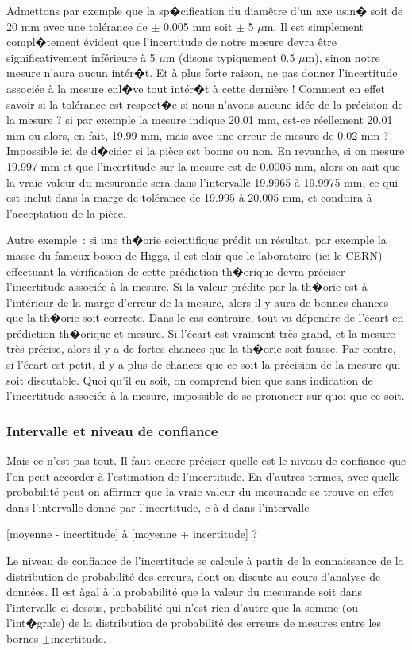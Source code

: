 Admettons par exemple que la sp�cification du diamêtre d'un axe usin� soit de 20 mm avec une tolérance de $\pm$ 0.005 mm soit $\pm$ 5 $\mu$m. Il est simplement compl�tement évident que l'incertitude de notre mesure devra être significativement inférieure à 5 $\mu$m (disons typiquement 0.5 $\mu$m), sinon notre mesure n'aura aucun intér�t. Et à plus forte raison, ne pas donner l'incertitude associée à la mesure enl�ve tout intér�t à cette dernière ! Comment en effet savoir si la tolérance est respect�e si nous n'avons aucune idée de la précision de la mesure ? si par exemple la mesure indique 20.01 mm, est-ce réellement 20.01 mm ou alors, en fait, 19.99 mm, mais avec une erreur de mesure de 0.02 mm ? Impossible ici de d�cider si la pièce est bonne ou non. En revanche, si on mesure 19.997 mm et que l'incertitude sur la mesure est de 0.0005 mm, alors on sait que la vraie valeur du mesurande sera dans l'intervalle 19.9965 à 19.9975 mm, ce qui est inclut dans la marge de tolérance de 19.995 à 20.005 mm, et conduira à l'acceptation de la pièce.

Autre exemple~: si une th�orie scientifique prédit un résultat, par exemple la masse du fameux boson de Higgs, il est clair que le laboratoire (ici le CERN) effectuant la vérification de cette prédiction th�orique devra préciser l'incertitude associée à la mesure. Si la valeur prédite par la th�orie est à l'intérieur de la marge d'erreur de la mesure, alors il y aura de bonnes chances que la th�orie soit correcte. Dans le cas contraire, tout va dépendre de l'écart en prédiction th�orique et mesure. Si l'écart est vraiment très grand, et la mesure très précise, alors il y a de fortes chances que la th�orie soit fausse. Par contre, si l'écart est petit, il y a plus de chances que ce soit la précision de la mesure qui soit discutable. Quoi qu'il en soit, on comprend bien que sans indication de l'incertitude associée à la mesure, impossible de se prononcer sur quoi que ce soit.

\newpage

\subsubsection*{Intervalle et niveau de confiance}

Mais ce n'est pas tout. Il faut encore préciser quelle est le niveau de confiance que l'on peut accorder à l'estimation de l'incertitude. En d'autres termes, avec quelle probabilité peut-on affirmer que la vraie valeur du mesurande se trouve en effet dans l'intervalle donné par l'incertitude, c-à-d dans l'intervalle
\begin{center}
[moyenne - incertitude] à [moyenne + incertitude] ?
\end{center}
Le niveau de confiance de l'incertitude se calcule à partir de la connaissance de la distribution de probabilité des erreurs, dont on discute au cours d'analyse de données. Il est àgal à la probabilité que la valeur du mesurande soit dans l'intervalle ci-dessus, probabilité qui n'est rien d'autre que la somme (ou l'int�grale) de la distribution de probabilité des erreurs de mesures entre les bornes $\pm$incertitude.


